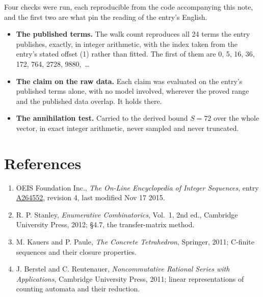 \documentclass[11pt]{article}
\theoremstyle{definition}
\begin{document}
Four checks were run, each reproducible from the code accompanying this note, and the first two are what pin the reading of the entry's English.

\begin{itemize}

\item {\bfseries The published terms.} The walk count reproduces all 24 terms the entry publishes, exactly, in integer arithmetic, with the index taken from the entry's stated offset (1) rather than fitted. The first of them are 0, 5, 16, 36, 172, 764, 2728, 9880,~\dots

\item {\bfseries The claim on the raw data.} Each claim was evaluated on the entry's published terms alone, with no model involved, wherever the proved range and the published data overlap. It holds there.

\item {\bfseries The annihilation test.} Carried to the derived bound $S = 72$ over the whole vector, in exact integer arithmetic, never sampled and never truncated.

\end{itemize}

\section{References}

\begin{enumerate}

\item OEIS Foundation Inc., \emph{The On-Line Encyclopedia of Integer Sequences}, entry \href{https://oeis.org/A264552}{A264552}, revision 4, last modified Nov 17 2015.

\item R. P. Stanley, \emph{Enumerative Combinatorics}, Vol.~1, 2nd ed., Cambridge University Press, 2012; \S4.7, the transfer-matrix method.

\item M. Kauers and P. Paule, \emph{The Concrete Tetrahedron}, Springer, 2011; C-finite sequences and their closure properties.

\item J. Berstel and C. Reutenauer, \emph{Noncommutative Rational Series with Applications}, Cambridge University Press, 2011; linear representations of counting automata and their reduction.

\end{enumerate}
\end{document}
